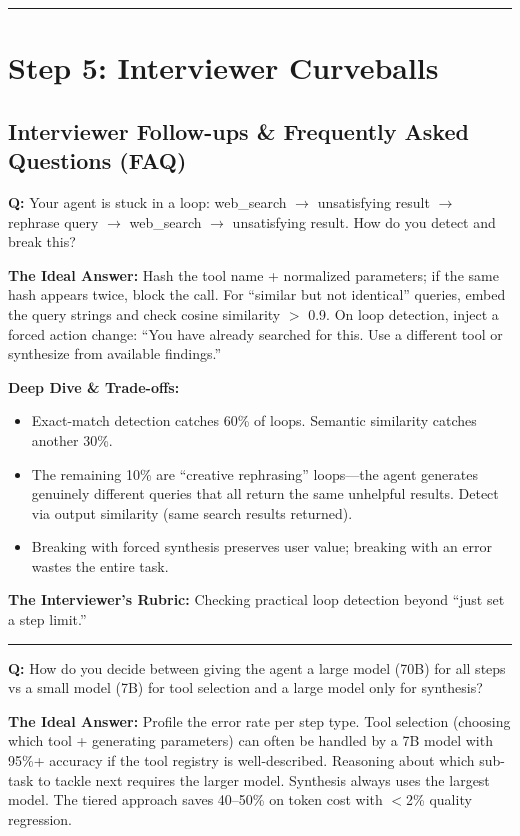 \bigskip\hrule\bigskip

\section*{Step 5: Interviewer Curveballs}

\subsection*{Interviewer Follow-ups \& Frequently Asked Questions (FAQ)}

\textbf{Q:} Your agent is stuck in a loop: web\_search $\rightarrow$ unsatisfying result $\rightarrow$ rephrase query $\rightarrow$ web\_search $\rightarrow$ unsatisfying result. How do you detect and break this?

\textbf{The Ideal Answer:} Hash the tool name + normalized parameters; if the same hash appears twice, block the call. For ``similar but not identical'' queries, embed the query strings and check cosine similarity $>$ 0.9. On loop detection, inject a forced action change: ``You have already searched for this. Use a different tool or synthesize from available findings.''

\textbf{Deep Dive \& Trade-offs:}
\begin{itemize}
  \item Exact-match detection catches 60\% of loops. Semantic similarity catches another 30\%.
  \item The remaining 10\% are ``creative rephrasing'' loops---the agent generates genuinely different queries that all return the same unhelpful results. Detect via output similarity (same search results returned).
  \item Breaking with forced synthesis preserves user value; breaking with an error wastes the entire task.
\end{itemize}

\textbf{The Interviewer's Rubric:} Checking practical loop detection beyond ``just set a step limit.''

\bigskip\hrule\bigskip

\textbf{Q:} How do you decide between giving the agent a large model (70B) for all steps vs a small model (7B) for tool selection and a large model only for synthesis?

\textbf{The Ideal Answer:} Profile the error rate per step type. Tool selection (choosing which tool + generating parameters) can often be handled by a 7B model with 95\%+ accuracy if the tool registry is well-described. Reasoning about which sub-task to tackle next requires the larger model. Synthesis always uses the largest model. The tiered approach saves 40--50\% on token cost with $<$2\% quality regression.

